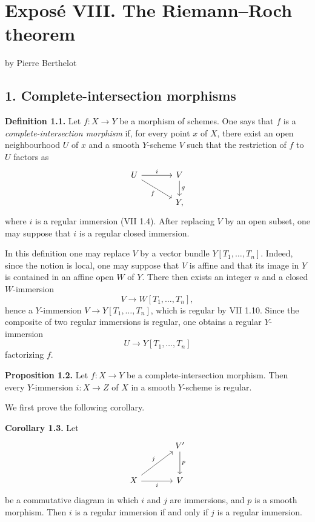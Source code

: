 \documentclass[11pt]{article}
\begin{document}
\providecommand{\etale}{\'etale}
\providecommand{\Ch}{\operatorname{Ch}}


\section*{Expos\'e VIII. The Riemann--Roch theorem}
\begin{center}
by Pierre Berthelot
\end{center}

\subsection*{1. Complete-intersection morphisms}

\textbf{Definition 1.1.} Let $f:X\to Y$ be a morphism of schemes. One says that $f$ is a \emph{complete-intersection morphism} if, for every point $x$ of $X$, there exist an open neighbourhood $U$ of $x$ and a smooth $Y$-scheme $V$ such that the restriction of $f$ to $U$ factors as
\[
\begin{tikzcd}[column sep=large]
U \arrow[r,"i"] \arrow[dr,"f"'] & V \arrow[d,"g"]\\
& Y,
\end{tikzcd}
\]
where $i$ is a regular immersion (VII 1.4). After replacing $V$ by an open subset, one may suppose that $i$ is a regular closed immersion.

In this definition one may replace $V$ by a vector bundle $Y[T_1,\ldots,T_n]$. Indeed, since the notion is local, one may suppose that $V$ is affine and that its image in $Y$ is contained in an affine open $W$ of $Y$. There then exists an integer $n$ and a closed $W$-immersion
\[
V\longrightarrow W[T_1,\ldots,T_n],
\]
hence a $Y$-immersion $V\to Y[T_1,\ldots,T_n]$, which is regular by VII 1.10. Since the composite of two regular immersions is regular, one obtains a regular $Y$-immersion
\[
U\longrightarrow Y[T_1,\ldots,T_n]
\]
factorizing $f$.

\textbf{Proposition 1.2.} Let $f:X\to Y$ be a complete-intersection morphism. Then every $Y$-immersion $i:X\to Z$ of $X$ in a smooth $Y$-scheme is regular.

We first prove the following corollary.

\textbf{Corollary 1.3.} Let
\[
\begin{tikzcd}[column sep=large,row sep=large]
& V' \arrow[d,"p"]\\
X \arrow[ur,"j"] \arrow[r,"i"'] & V
\end{tikzcd}
\]
be a commutative diagram in which $i$ and $j$ are immersions, and $p$ is a smooth morphism. Then $i$ is a regular immersion if and only if $j$ is a regular immersion.
\end{document}
